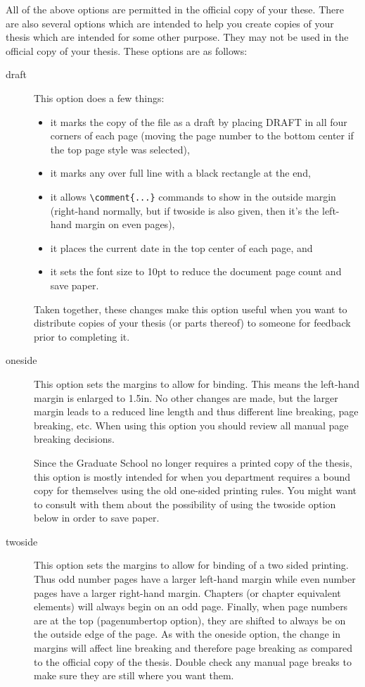 All of the above options are permitted in the official copy of your these.  There are also several options which are intended to help you create copies of your thesis which are intended for some other purpose.  They may not be used in the official copy of your thesis.  These options are as follows:

\begin{description}
\item[draft]{This option does a few things:
	\begin{itemize}
	\item{it marks the copy of the file as a draft by placing DRAFT in all four corners of each page (moving the page number to the bottom center if the top page style was selected),}
	\item{it marks any over full line with a black rectangle at the end,}
	\item{it allows \verb=\comment{...}= commands to show in the outside margin (right-hand normally, but if twoside is also given, then it's the left-hand margin on even pages),}
	\item{it places the current date in the top center of each page, and}
	\item{it sets the font size to 10pt to reduce the document page count and save paper.}
	\end{itemize}
Taken together, these changes make this option useful when you want to distribute copies of your thesis (or parts thereof) to someone for feedback prior to completing it.}
\item[oneside]{This option sets the margins to allow for binding.  This means the left-hand margin is enlarged to 1.5in.  No other changes are made, but the larger margin leads to a reduced line length and thus different line breaking, page breaking, etc.  When using this option you should review all manual page breaking decisions.

Since the Graduate School no longer requires a printed copy of the thesis, this option is mostly intended for when you department requires a bound copy for themselves using the old one-sided printing rules.  You might want to consult with them about the possibility of using the twoside option below in order to save paper.}
\item[twoside]{This option sets the margins to allow for binding of a two sided printing.  Thus odd number pages have a larger left-hand margin while even number pages have a larger right-hand margin.  Chapters (or chapter equivalent elements) will always begin on an odd page.  Finally, when page numbers are at the top (pagenumbertop option), they are shifted to always be on the outside edge of the page.  As with the oneside option, the change in margins will affect line breaking and therefore page breaking as compared to the official copy of the thesis.  Double check any manual page breaks to make sure they are still where you want them.

}
\end{description}
